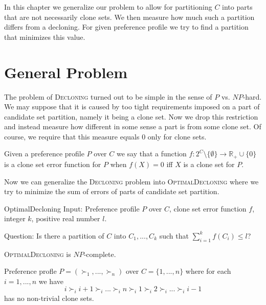 In this chapter we generalize our problem to allow for partitioning $C$ into parts
that are not necessarily clone sets.
We then measure how much such a partition differs from a decloning.
For given preference profile we try to find a partition that minimizes this value.

\section{General Problem}

The problem of \textsc{Decloning} turned out to be simple in the sense of $P$ vs. $NP$-hard.
We may suppose that it is caused by too tight requirements imposed on a part of candidate set partition,
namely it being a clone set.
Now we drop this restriction and instead measure how different in some sense a part is from some clone set.
Of course, we require that this measure equals $0$ only for clone sets.

\begin{defn}
Given a preference profile $P$ over $C$ we say that a function
$f: 2^C \setminus \{\emptyset\} \rightarrow \mathbb{R}_+\cup\{0\}$
is a clone set error function for $P$ when $f(X) = 0$ iff $X$ is a clone set for $P$.
\end{defn}

Now we can generalize the \textsc{Decloning} problem into \textsc{OptimalDecloning}
where we try to minimize the sum of errors of parts of candidate set partition.


\begin{problem}{OptimalDecloning}
	Input: Preference profile $P$ over $C$, clone set error function $f$,
		integer $k$, positive real number $l$.

	Question: Is there a partition of $C$ into $C_1, ..., C_k$ such that $\sum_{i=1}^k f(C_i) \leq l$?
\end{problem}

\begin{thm} \label{optdecl}
	\textsc{OptimalDecloning} is $NP$-complete.
\end{thm}

\begin{lmm} \label{lmmnotrivial}
	Preference profle $P = (\succ_1, ... , \succ_n)$ over $C = \{1, ..., n\}$
	where for each $i=1,...,n$ we have
	$$i \succ_i i+1 \succ_i ... \succ_i n \succ_i 1 \succ_i 2 \succ_i ... \succ_i i-1$$
	has no non-trivial clone sets.
\end{lmm}

